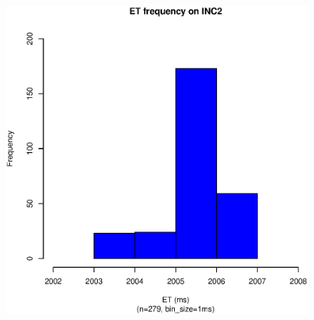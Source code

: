 \begin{figure}[hp!]
{		\includegraphics[scale=0.43]{sodb9/2_sec_et_hist_v5.eps}
		\label{fig:inc2_et_hist_v5}
	}
\end{figure}
